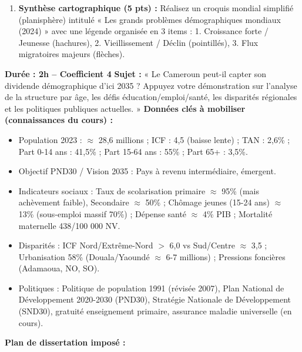\documentclass[11pt]{article}
\begin{document}
\begin{exercice}
\begin{enumerate}
\begin{enumerate}
        \item Discutez l'affirmation du Doc 4 : « La croissance démographique se concentre dans les pays les plus pauvres ». Est-ce un frein ou une opportunité (dividende démographique) pour le développement ? Argumentez.
    \end{enumerate}
    \item \textbf{Synthèse cartographique (5 pts) :} Réalisez un croquis mondial simplifié (planisphère) intitulé « Les grands problèmes démographiques mondiaux (2024) » avec une légende organisée en 3 items : 1. Croissance forte / Jeunesse (hachures), 2. Vieillissement / Déclin (pointillés), 3. Flux migratoires majeurs (flèches).
\end{enumerate}
\end{exercice}

\begin{exercice}
\textbf{Durée : 2h -- Coefficient 4}
\textbf{Sujet :} « Le Cameroun peut-il capter son dividende démographique d'ici 2035 ? Appuyez votre démonstration sur l'analyse de la structure par âge, les défis éducation/emploi/santé, les disparités régionales et les politiques publiques actuelles. »
\textbf{Données clés à mobiliser (connaissances du cours) :}
\begin{itemize}
    \item Population 2023 : $\approx$ 28,6 millions ; ICF : 4,5 (baisse lente) ; TAN : 2,6\% ; Part 0-14 ans : 41,5\% ; Part 15-64 ans : 55\% ; Part 65+ : 3,5\%.
    \item Objectif PND30 / Vision 2035 : Pays à revenu intermédiaire, émergent.
    \item Indicateurs sociaux : Taux de scolarisation primaire $\approx$ 95\% (mais achèvement faible), Secondaire $\approx$ 50\% ; Chômage jeunes (15-24 ans) $\approx$ 13\% (sous-emploi massif 70\%) ; Dépense santé $\approx$ 4\% PIB ; Mortalité maternelle 438/100 000 NV.
    \item Disparités : ICF Nord/Extrême-Nord $>$ 6,0 vs Sud/Centre $\approx$ 3,5 ; Urbanisation 58\% (Douala/Yaoundé $\approx$ 6-7 millions) ; Pressions foncières (Adamaoua, NO, SO).
    \item Politiques : Politique de population 1991 (révisée 2007), Plan National de Développement 2020-2030 (PND30), Stratégie Nationale de Développement (SND30), gratuité enseignement primaire, assurance maladie universelle (en cours).
\end{itemize}
\textbf{Plan de dissertation imposé :}

\end{exercice}
\end{document}
